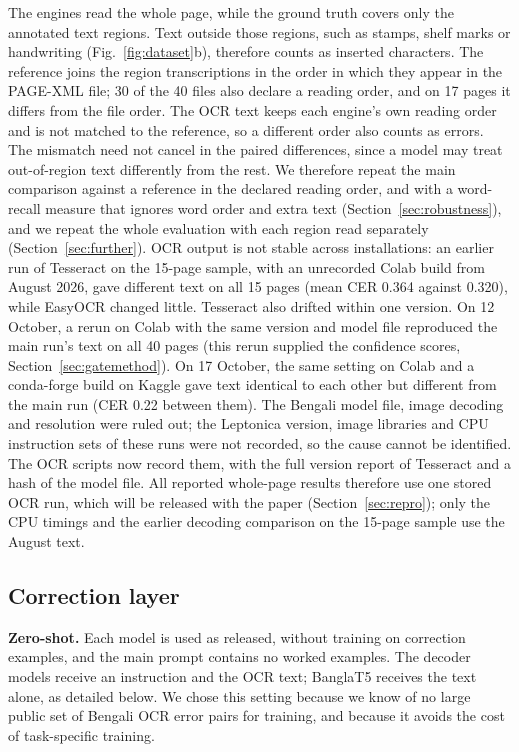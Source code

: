 \documentclass[conference]{IEEEtran}
\begin{document}
The engines read the whole page, while the ground truth covers only the annotated text regions. Text outside those regions, such as stamps, shelf marks or handwriting (Fig.~\ref{fig:dataset}b), therefore counts as inserted characters. The reference joins the region transcriptions in the order in which they appear in the PAGE-XML file; 30 of the 40 files also declare a reading order, and on 17 pages it differs from the file order. The OCR text keeps each engine's own reading order and is not matched to the reference, so a different order also counts as errors. The mismatch need not cancel in the paired differences, since a model may treat out-of-region text differently from the rest. We therefore repeat the main comparison against a reference in the declared reading order, and with a word-recall measure that ignores word order and extra text (Section~\ref{sec:robustness}), and we repeat the whole evaluation with each region read separately (Section~\ref{sec:further}). OCR output is not stable across installations: an earlier run of Tesseract on the 15-page sample, with an unrecorded Colab build from August 2026, gave different text on all 15 pages (mean CER 0.364 against 0.320), while EasyOCR changed little. Tesseract also drifted within one version. On 12 October, a rerun on Colab with the same version and model file reproduced the main run's text on all 40 pages (this rerun supplied the confidence scores, Section~\ref{sec:gatemethod}). On 17 October, the same setting on Colab and a conda-forge build on Kaggle gave text identical to each other but different from the main run (CER 0.22 between them). The Bengali model file, image decoding and resolution were ruled out; the Leptonica version, image libraries and CPU instruction sets of these runs were not recorded, so the cause cannot be identified. The OCR scripts now record them, with the full version report of Tesseract and a hash of the model file. All reported whole-page results therefore use one stored OCR run, which will be released with the paper (Section~\ref{sec:repro}); only the CPU timings and the earlier decoding comparison on the 15-page sample use the August text.

\subsection{Correction layer}
\label{sec:correction}
\textbf{Zero-shot.} Each model is used as released, without training on correction examples, and the main prompt contains no worked examples. The decoder models receive an instruction and the OCR text; BanglaT5 receives the text alone, as detailed below. We chose this setting because we know of no large public set of Bengali OCR error pairs for training, and because it avoids the cost of task-specific training.
\end{document}
